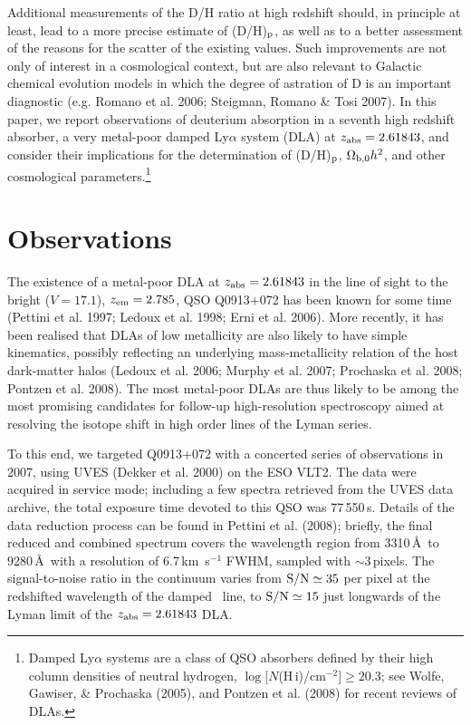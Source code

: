 \documentclass[useAMS,usenatbib]{mn2e}
\begin{document}
Additional measurements of the D/H ratio
at high redshift should, in principle at least, lead to
a more precise estimate of (D/H)$_{\rm p}$,
as well as to a better assessment of the reasons for the
scatter of the existing values. Such improvements are
not only of interest in a cosmological context, but are
also relevant to Galactic chemical evolution models
in which the degree of astration of D is an important
diagnostic (e.g. Romano et al. 2006; Steigman, Romano \& Tosi 2007).
In this paper, we report observations of deuterium absorption
in a seventh high redshift absorber,
a very metal-poor damped Ly$\alpha$ system (DLA)
at $z_{\rm abs} = 2.61843$, and consider their implications
for the determination of (D/H)$_{\rm p}$, $\Omega_{\rm b,0} h^2$, and
other cosmological parameters.\footnote{Damped Ly$\alpha$ systems
are a class of QSO absorbers defined by their high
column densities of neutral hydrogen,
$\log [N$(H\,{\sc i})/cm$^{-2}] \geq 20.3$;
see Wolfe, Gawiser, \& Prochaska (2005), and Pontzen et al. (2008) for
recent reviews of DLAs.}


\section{Observations}
\label{sec:obs}

The existence of a metal-poor DLA at $z_{\rm abs} = 2.61843$
in the line of sight to the bright ($V = 17.1$), $z_{\rm em} = 2.785$,
QSO Q0913+072 has been known for some time (Pettini et al. 1997;
Ledoux et al. 1998; Erni et al. 2006).
More recently, it has been realised that DLAs of low metallicity
are also likely to have simple kinematics, possibly reflecting
an underlying mass-metallicity relation of the host dark-matter
halos (Ledoux et al. 2006; Murphy et al. 2007; Prochaska et al. 2008; 
Pontzen et al. 2008).
The most metal-poor DLAs are thus likely to be among the most
promising candidates for follow-up high-resolution spectroscopy
aimed at resolving the isotope shift in high order lines of the Lyman
series.

To this end, we targeted Q0913+072 with a concerted series
of observations in 2007, using UVES (Dekker et al. 2000) on the ESO VLT2.
The data were acquired in service mode; including a few spectra
retrieved from the UVES data archive, the total exposure time
devoted to this QSO was 77\,550\,s.
Details of the data reduction process can be found in Pettini et al. (2008);
briefly, the final reduced and combined spectrum covers the wavelength
region from 3310\,\AA\ to 9280\,\AA\ with a resolution of 6.7\,km~s$^{-1}$
FWHM, sampled with $\sim 3$\,pixels. The signal-to-noise ratio
in the continuum
varies from ${\rm S/N} \simeq 35$ per pixel
at the redshifted wavelength
of the damped \lya\ line, to ${\rm S/N} \simeq 15$ just longwards
of the Lyman limit 
of the $z_{\rm abs} = 2.61843$ DLA.
\end{document}
